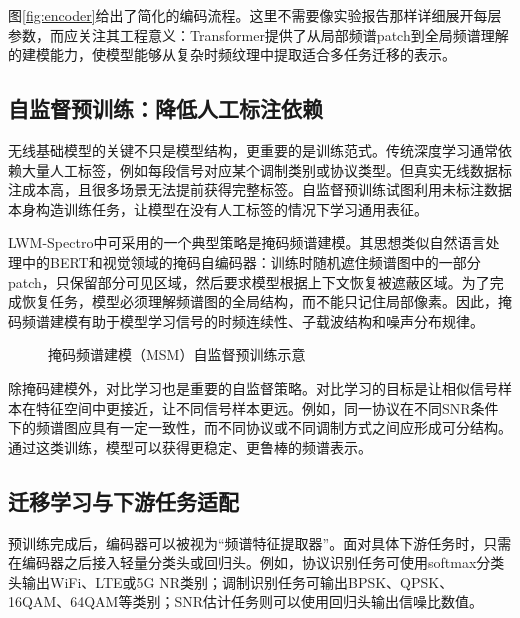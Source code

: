 \documentclass[UTF8,fontset=windows,zihao=-4]{ctexart}
\begin{document}
图\ref{fig:encoder}给出了简化的编码流程。这里不需要像实验报告那样详细展开每层参数，而应关注其工程意义：Transformer提供了从局部频谱patch到全局频谱理解的建模能力，使模型能够从复杂时频纹理中提取适合多任务迁移的表示。

\subsection{自监督预训练：降低人工标注依赖}
无线基础模型的关键不只是模型结构，更重要的是训练范式。传统深度学习通常依赖大量人工标签，例如每段信号对应某个调制类别或协议类型。但真实无线数据标注成本高，且很多场景无法提前获得完整标签。自监督预训练试图利用未标注数据本身构造训练任务，让模型在没有人工标签的情况下学习通用表征。

LWM-Spectro中可采用的一个典型策略是掩码频谱建模。其思想类似自然语言处理中的BERT和视觉领域的掩码自编码器\cite{devlin,mae}：训练时随机遮住频谱图中的一部分patch，只保留部分可见区域，然后要求模型根据上下文恢复被遮蔽区域。为了完成恢复任务，模型必须理解频谱图的全局结构，而不能只记住局部像素。因此，掩码频谱建模有助于模型学习信号的时频连续性、子载波结构和噪声分布规律。

\begin{figure}[H]
\centering
{}
\caption{掩码频谱建模（MSM）自监督预训练示意}
\label{fig:msm}
\end{figure}

除掩码建模外，对比学习也是重要的自监督策略。对比学习的目标是让相似信号样本在特征空间中更接近，让不同信号样本更远。例如，同一协议在不同SNR条件下的频谱图应具有一定一致性，而不同协议或不同调制方式之间应形成可分结构。通过这类训练，模型可以获得更稳定、更鲁棒的频谱表示。

\subsection{迁移学习与下游任务适配}
预训练完成后，编码器可以被视为“频谱特征提取器”。面对具体下游任务时，只需在编码器之后接入轻量分类头或回归头。例如，协议识别任务可使用softmax分类头输出WiFi、LTE或5G NR类别；调制识别任务可输出BPSK、QPSK、16QAM、64QAM等类别；SNR估计任务则可以使用回归头输出信噪比数值。
\end{document}
